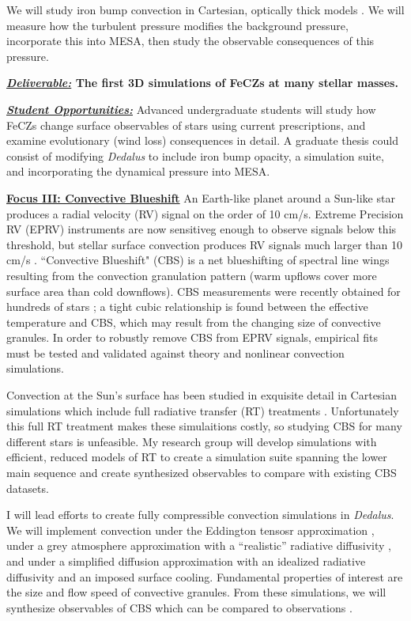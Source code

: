 \documentclass[12pt]{article}
\newcommand{\sct}[1]{\vspace{0.3cm}\hspace{-\parindent}\textbf{\underline{#1}}\hspace{0.3cm}}
\begin{document}
We will study iron bump convection in Cartesian, optically thick models \citep[good approximations,][]{jermyn_etal_2022_atlas}.
We will measure how the turbulent pressure modifies the background pressure, incorporate this into MESA, then study the observable consequences of this pressure.

\textbf{\underline{\emph{Deliverable:}} The first 3D simulations of FeCZs at many stellar masses.}

\textbf{\underline{\emph{Student Opportunities:}}} Advanced undergraduate students will study how FeCZs change surface observables of stars using current prescriptions, and examine evolutionary (wind loss) consequences in detail.
A graduate thesis could consist of modifying \emph{Dedalus} to include iron bump opacity, a simulation suite, and incorporating the dynamical pressure into MESA.

\sct{Focus III: Convective Blueshift}
An Earth-like planet around a Sun-like star produces a radial velocity (RV) signal on the order of 10 cm/s.
Extreme Precision RV (EPRV) instruments are now sensitiveg enough to observe signals below this threshold, but stellar surface convection produces RV signals much larger than 10 cm/s \citep{crass_etal_2021}.
``Convective Blueshift" (CBS) is a net blueshifting of spectral line wings resulting from the convection granulation pattern (warm upflows cover more surface area than cold downflows).
CBS measurements were recently obtained for hundreds of stars \citep{liebing_etal_2021}; a tight cubic relationship is found between the effective temperature and CBS, which may result from the changing size of convective granules. %
In order to robustly remove CBS from EPRV signals, empirical fits must be tested and validated against theory and nonlinear convection simulations. 

Convection at the Sun's surface has been studied in exquisite detail in Cartesian simulations which include full radiative transfer (RT) treatments \citep[e.g.,][]{rempel2020, danilovic_etal_2022}.
Unfortunately this full RT treatment makes these simulaitions costly, so studying CBS for many different stars is unfeasible.
My research group will develop simulations with efficient, reduced models of RT to create a simulation suite spanning the lower main sequence and create synthesized observables to compare with existing CBS datasets.

I will lead efforts to create fully compressible convection simulations in \emph{Dedalus}.
We will implement convection under the Eddington tensosr approximation \citep[e.g., ref.][sct.~XI.G]{burns_etal_2020}, under a grey atmosphere approximation with a ``realistic'' radiative diffusivity \citep{barekat_brandenburg_2014}, and under a simplified diffusion approximation with an idealized radiative diffusivity and an imposed surface cooling.
Fundamental properties of interest are the size and flow speed of convective granules.
From these simulations, we will synthesize observables of CBS which can be compared to observations \citep{liebing_etal_2021}.
\end{document}
